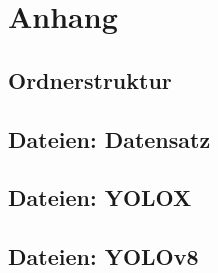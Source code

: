 \chapter{Anhang}\label{chap:appendix}
\section{Ordnerstruktur}


\section{Dateien: Datensatz}


\section{Dateien: YOLOX}


\section{Dateien: YOLOv8}